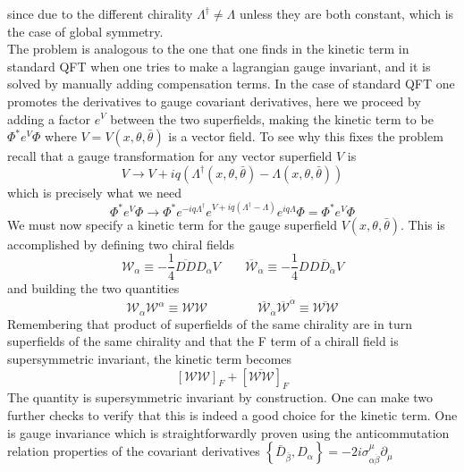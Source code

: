 \documentclass[12pt]{article}
\begin{document}
since due to the different chirality $\Lambda^\dagger \neq \Lambda $ unless they are both constant, which is the case of global symmetry. \\
The problem is analogous to the one that one finds in the kinetic term in standard QFT when one tries to make a lagrangian gauge invariant, and it is solved by manually adding compensation terms. In the case of standard QFT one
promotes the derivatives to gauge covariant derivatives, here we proceed by adding a factor $e^V$ between the two superfields, making the kinetic term to be $\Phi^* e^V \Phi$ where $V=V(x,\theta,\bar\theta)$ is a vector field. To see why this fixes the problem recall that a gauge transformation for any vector superfield $V$ is
\begin{equation*}
  V \to V + iq\left(\Lambda^\dagger(x, \theta, \bar\theta) - \Lambda(x, \theta, \bar\theta)\right)
\end{equation*}
which is precisely what we need
\begin{equation*}
  \Phi^* e^V \Phi \to \Phi^* e^{-iq\Lambda^\dagger } e^{V + iq(\Lambda^\dagger - \Lambda)} e^{iq\Lambda} \Phi = \Phi^* e^V \Phi
\end{equation*}
We must now specify a kinetic term for the gauge superfield $V(x, \theta, \bar\theta)$. This is accomplished by defining two chiral fields 
\begin{equation*}
  \mathcal{W_\alpha} \equiv -\frac{1}{4}\overline{DD}D_\alpha V \qquad \overline{\mathcal{W}}_{\dot\alpha} \equiv -\frac{1}{4}DD \overline{D}_{\dot\alpha} V
\end{equation*}
and building the two quantities
\begin{equation*}
  \mathcal{W}_{\alpha} \mathcal{W}^{\alpha} \equiv \mathcal{W}\mathcal{W} \qquad\qquad \overline{\mathcal{W}}_{\dot\alpha} \overline{\mathcal{W}}^{\dot\alpha} \equiv \overline{\mathcal{W}\mathcal{W}}
\end{equation*}
Remembering that product of superfields of the same chirality are in turn superfields of the same chirality and that the F term of a chirall field is supersymmetric invariant, the kinetic term becomes 
\begin{equation*}
  \left[\mathcal{W}\mathcal{W}\right]_F + \left[\overline{\mathcal{W}\mathcal{W}}\right]_F
\end{equation*}
The quantity is supersymmetric invariant by construction. One can make two further checks to verify that this is indeed a good choice for the kinetic term. One is gauge invariance which is straightforwardly proven using the anticommutation relation properties of the covariant derivatives $\left\{\bar{D}_{\bar\beta}, D_{\alpha}\right\}= - 2 i \sigma_{\alpha \dot{\beta}}^{\mu} \partial_{\mu}$
\end{document}
